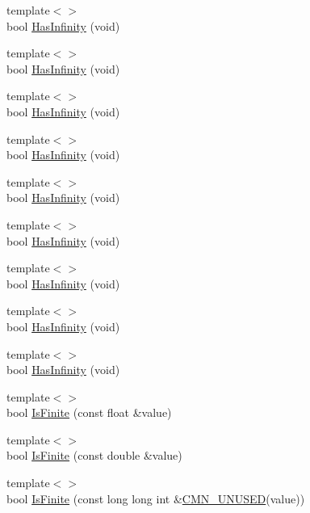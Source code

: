 \begin{DoxyCompactItemize}
{\footnotesize template$<$$>$ }\\bool \hyperlink{classcmn_type_traits_a6cda6cf5b9ff2d4ccf5e1fcd934e64b0}{Has\+Infinity} (void)
\item 
{\footnotesize template$<$$>$ }\\bool \hyperlink{classcmn_type_traits_a0c79f6aa5d2a5e62122064f499c9573a}{Has\+Infinity} (void)
\item 
{\footnotesize template$<$$>$ }\\bool \hyperlink{classcmn_type_traits_ac266cf990b2af31774d1c3e622be8d71}{Has\+Infinity} (void)
\item 
{\footnotesize template$<$$>$ }\\bool \hyperlink{classcmn_type_traits_aa280a48014460c82e28e306b854ddfba}{Has\+Infinity} (void)
\item 
{\footnotesize template$<$$>$ }\\bool \hyperlink{classcmn_type_traits_a5a4ce9063842cf1e4f32ac0a4200434c}{Has\+Infinity} (void)
\item 
{\footnotesize template$<$$>$ }\\bool \hyperlink{classcmn_type_traits_a636ab18b494eaad348b6f1a00ff7e61a}{Has\+Infinity} (void)
\item 
{\footnotesize template$<$$>$ }\\bool \hyperlink{classcmn_type_traits_ace3dad79fd9f9a12af249506bf490854}{Has\+Infinity} (void)
\item 
{\footnotesize template$<$$>$ }\\bool \hyperlink{classcmn_type_traits_a07e2ed4190907bbc9f2ba8481c3178df}{Has\+Infinity} (void)
\item 
{\footnotesize template$<$$>$ }\\bool \hyperlink{classcmn_type_traits_a86c9f722ff4b0d4d3089bed930dde31b}{Has\+Infinity} (void)
\item 
{\footnotesize template$<$$>$ }\\bool \hyperlink{classcmn_type_traits_a396dde53d2ce6a88e7d9004b849ab8d8}{Is\+Finite} (const float \&value)
\item 
{\footnotesize template$<$$>$ }\\bool \hyperlink{classcmn_type_traits_ae59ae17d0b0c9d93b33512381c2be9d4}{Is\+Finite} (const double \&value)
\item 
{\footnotesize template$<$$>$ }\\bool \hyperlink{classcmn_type_traits_a7bf1f83b4a1c429fd974f67a0bc76e3f}{Is\+Finite} (const long long int \&\hyperlink{cmn_portability_8h_a021894e2626935fa2305434b1e893ff6}{C\+M\+N\+\_\+\+U\+N\+U\+S\+E\+D}(value))

\end{DoxyCompactItemize}
